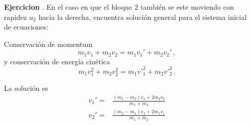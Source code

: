 \begin{itemize}
\item[\textbf{Ejercicion}]. En el caso en que el bloque 2 también se este moviendo con rapidez $u_2$ hacia la derecha, encuentra soluci\'on general para el sistema inicial de ecuaciones:

Conservaci\'on de momentum
\begin{equation}\label{eq:E1}
  m_1 v_1 + m_2 v_2 = m_1 v_1' + m_2 v_2'\,,
\end{equation}
y conservaci\'on de energía cinética
\begin{equation}\label{eq:E2}
  m_1 v^2_1 + m_2 v^2_2 = m_1 {v'}^2_1 + m_2 {v'}^2_2\,.
\end{equation}
  
La solución es
\begin{align}
  v_1' =& \frac{(m_1 - m_2)v_1 + 2m_2 v_2}{m_1 + m_2} \nonumber\\
  v_2' =& \frac{(m_2 - m_1)v_2 + 2m_1 v_1}{m_1+ m_2}
\end{align}
\end{itemize}



